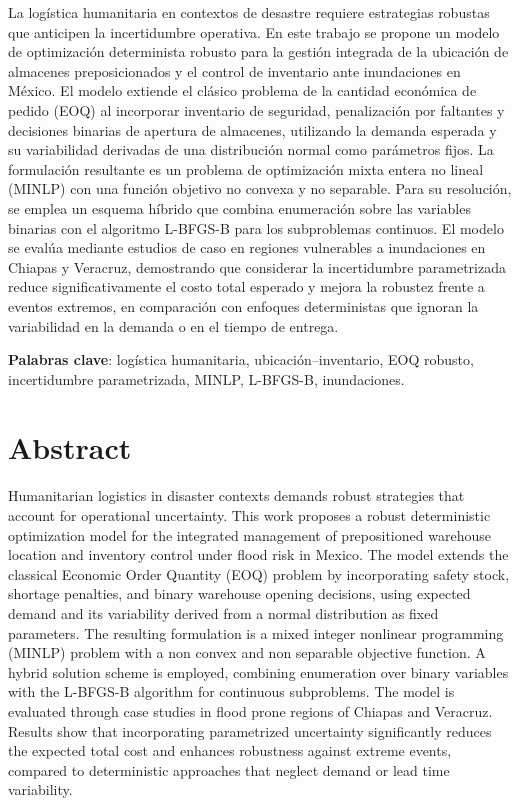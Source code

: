 \documentclass[
  spanish,
  us-letterpaper,
]{scrreprt}
\numberwithin{equation}{section}
\begin{document}
La logística humanitaria en contextos de desastre requiere estrategias
robustas que anticipen la incertidumbre operativa. En este trabajo se
propone un modelo de optimización determinista robusto para la gestión
integrada de la ubicación de almacenes preposicionados y el control de
inventario ante inundaciones en México. El modelo extiende el clásico
problema de la cantidad económica de pedido (EOQ) al incorporar
inventario de seguridad, penalización por faltantes y decisiones
binarias de apertura de almacenes, utilizando la demanda esperada y su
variabilidad derivadas de una distribución normal como parámetros fijos.
La formulación resultante es un problema de optimización mixta entera no
lineal (MINLP) con una función objetivo no convexa y no separable. Para
su resolución, se emplea un esquema híbrido que combina enumeración
sobre las variables binarias con el algoritmo L-BFGS-B para los
subproblemas continuos. El modelo se evalúa mediante estudios de caso en
regiones vulnerables a inundaciones en Chiapas y Veracruz, demostrando
que considerar la incertidumbre parametrizada reduce significativamente
el costo total esperado y mejora la robustez frente a eventos extremos,
en comparación con enfoques deterministas que ignoran la variabilidad en
la demanda o en el tiempo de entrega.

\textbf{Palabras clave}: logística humanitaria, ubicación--inventario,
EOQ robusto, incertidumbre parametrizada, MINLP, L-BFGS-B, inundaciones.

\section{Abstract}\label{abstract}

Humanitarian logistics in disaster contexts demands robust strategies
that account for operational uncertainty. This work proposes a robust
deterministic optimization model for the integrated management of
prepositioned warehouse location and inventory control under flood risk
in Mexico. The model extends the classical Economic Order Quantity (EOQ)
problem by incorporating safety stock, shortage penalties, and binary
warehouse opening decisions, using expected demand and its variability
derived from a normal distribution as fixed parameters. The resulting
formulation is a mixed integer nonlinear programming (MINLP) problem
with a non convex and non separable objective function. A hybrid
solution scheme is employed, combining enumeration over binary variables
with the L-BFGS-B algorithm for continuous subproblems. The model is
evaluated through case studies in flood prone regions of Chiapas and
Veracruz. Results show that incorporating parametrized uncertainty
significantly reduces the expected total cost and enhances robustness
against extreme events, compared to deterministic approaches that
neglect demand or lead time variability.
\end{document}
